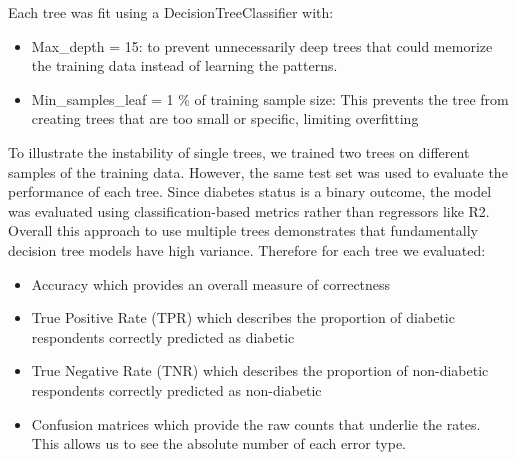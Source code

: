 \documentclass{article}
\theoremstyle{plain}
\theoremstyle{definition}
\theoremstyle{remark}
\begin{document}
Each tree was fit using a DecisionTreeClassifier with:
\begin{itemize}
    \item Max\_depth = 15: to prevent unnecessarily deep trees that could memorize the training data instead of learning the patterns.
    \item Min\_samples\_leaf = 1 \% of training sample size: This prevents the tree from creating trees that are too small or specific, limiting overfitting
\end{itemize}
To illustrate the instability of single trees, we trained two trees on different samples of the training data. However, the same test set was used to evaluate the performance of each tree. Since diabetes status is a binary outcome, the model was evaluated using classification-based metrics rather than regressors like R2. Overall this approach to use multiple trees demonstrates that fundamentally decision tree models have high variance. Therefore for each tree we evaluated:
\begin{itemize}
    \item Accuracy which provides an overall measure of correctness
    \item True Positive Rate (TPR) which describes the proportion of diabetic respondents correctly predicted as diabetic
    \item True Negative Rate (TNR) which describes the proportion of non-diabetic respondents correctly predicted as non-diabetic
    \item Confusion matrices which provide the raw counts that underlie the rates. This allows us to see the absolute number of each error type.
\end{itemize}
\end{document}
